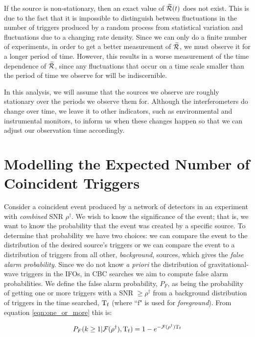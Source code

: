 If the source is non-stationary, then an exact value of $\widetilde{\mathcal{R}}(t)$ does not exist. This is due to the fact that it is impossible to distinguish between fluctuations in the number of triggers produced by a random process from statistical variation and fluctuations due to a changing rate density. Since we can only do a finite number of experiments, in order to get a better measurement of $\widetilde{\mathcal{R}}$, we must observe it for a longer period of time. However, this results in a worse measurement of the time dependence of $\widetilde{\mathcal{R}}$, since any fluctuations that occur on a time scale smaller than the period of time we observe for will be indiscernible. 

In this analysis, we will assume that the sources we observe are roughly stationary over the periods we observe them for. Although the interferometers do change over time, we leave it to other indicators, such as environmental and instrumental monitors, to inform us when these changes happen so that we can adjust our observation time accordingly.

\section{Modelling the Expected Number of Coincident Triggers}
\label{sec:coincidence_modelling}

Consider a coincident event produced by a network of detectors in an experiment with \emph{combined} \ac{SNR} $\rho^\dagger$. We wish to know the significance of the event; that is, we want to know the probability that the event was created by a specific source. To determine that probability we have two choices: we can compare the event to the distribution of the desired source's triggers or we can compare the event to a distribution of triggers from all other, \emph{background}, sources, which gives the \emph{false alarm probability}. Since we do not know \emph{a priori} the distribution of gravitational-wave triggers in the \acp{IFO}, in \ac{CBC} searches we aim to compute false alarm probabilities. We define the false alarm probability, $P_F$, as being the probability of getting one or more triggers with a \ac{SNR} $\geq \rho^\dagger$ from a background distribution of triggers in the time searched, $\mathrm{T_f}$ (where ``$\mathrm{f}$" is used for \emph{foreground}). From equation \ref{eqn:one_or_more} this is:

\begin{equation}
P_F(k\geq1 | \mathcal{F}(\rho^\dagger), \mathrm{T_f}) = 1 - e^{-\mathcal{F}(\rho^\dagger) \mathrm{T_f}}
\end{equation}

